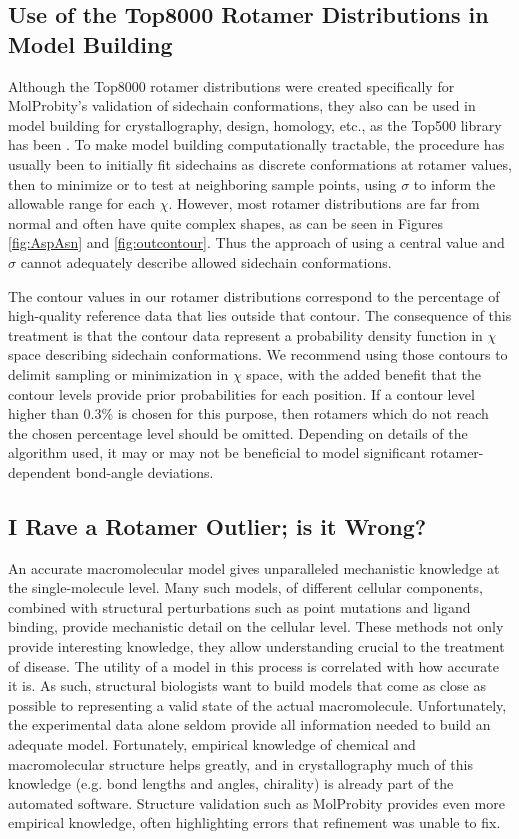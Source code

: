 \subsection{Use of the Top8000 Rotamer Distributions in Model Building}
Although the Top8000 rotamer distributions were created specifically for MolProbity's validation of sidechain conformations, they also can be used in model building for crystallography, design, homology, etc., as the Top500 library has been \cite{Arendall2005, Langer2008, Emsley:ba5144, Headd2008, Terwilliger2008, Adams:2010fk, Gainza2013,Porebski2016}. To make model building computationally tractable, \textcolor{changecolor}{the procedure has usually been to} initially fit sidechains as discrete conformations at rotamer values, then to minimize or to test at neighboring sample points, using $\sigma$ to inform the allowable range for each $\chi$. However, most rotamer distributions are far from normal and often have quite complex shapes, as can be seen in Figures \ref{fig:AspAsn} and \ref{fig:outcontour}. Thus the approach of using a central value and $\sigma$ cannot adequately describe allowed sidechain conformations. 

The contour values in our rotamer distributions correspond to the percentage of high-quality reference data that lies outside that contour. The consequence of this treatment is that the contour data represent a probability density function in $\chi$ space describing sidechain conformations. We recommend using those contours to delimit sampling or minimization in $\chi$ space, with the added benefit that the contour levels provide prior probabilities for each position. If a contour level higher than 0.3\% is chosen for this purpose, then rotamers which do not reach the chosen percentage level should be omitted. Depending on details of the algorithm used, it may or may not be beneficial to model significant rotamer-dependent bond-angle deviations.

\subsection{I Rave a Rotamer Outlier; is it Wrong?}
An accurate macromolecular model gives unparalleled mechanistic knowledge at the single-molecule level. Many such models, of different cellular components, combined with structural perturbations such as point mutations and ligand binding, provide mechanistic detail on the cellular level. These methods not only provide interesting knowledge, they allow understanding crucial to the treatment of disease. The utility of a model in this process is correlated with how accurate it is. As such, structural biologists want to build models that come as close as possible to representing a valid state of the actual macromolecule. Unfortunately, the experimental data alone seldom provide all information needed to build an adequate model. Fortunately, empirical knowledge of chemical and macromolecular structure helps greatly, and in crystallography much of this knowledge (e.g. bond lengths and angles, chirality) is already part of the automated software. Structure validation such as MolProbity provides even more empirical knowledge, often highlighting errors that refinement was unable to fix.

